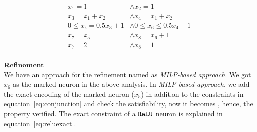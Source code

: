 \begin{equation}
    \begin{aligned}
        x_1 = 1 & \land x_2 = 1 \\
        x_3 = x_1 + x_2 & \land x_4 = x_1 + x_2 \\
        0 \leq x_5 = 0.5x_3 + 1 & \land 0\leq x_6 \leq 0.5x_4 + 1 \\ 
        x_7 = x_5 & \land x_8 = x_6 + 1 \\
        x_7 = 2 & \land x_8 = 1
    \end{aligned}
\label{eq:opt1}
\end{equation}
\\
\textbf{Refinement} \\
We have an approach for the refinement named as {\em MILP-based approach}.
We got $x_6$ as the marked neuron in the above analysis. 
In {\em MILP based approach}, we add the exact encoding of the marked neuron ($x_5$) in addition to the constraints
in equation~\ref{eq:conjunction} and check the satisfiability, now it becomes \unsat{}, hence, the property verified. 
The exact constraint of a $\mathtt{ReLU}${} neuron is explained in equation~\ref{eq:reluexact}. 






